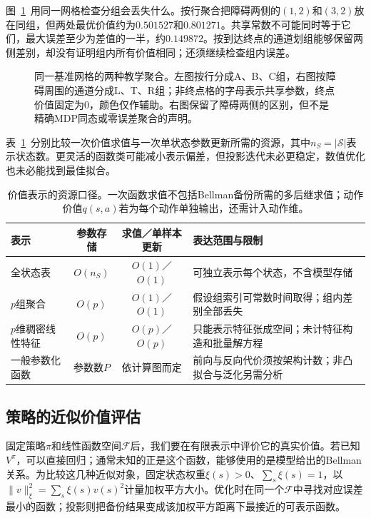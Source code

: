 图~\ref{fig:rl-planning-aggregation}~用同一网格检查分组会丢失什么。按行聚合把障碍两侧的$(1,2)$和$(3,2)$放在同组，但两处最优价值约为$0.501527$和$0.801271$。共享常数不可能同时等于它们，最大误差至少为差值的一半，约$0.149872$。按到达终点的通道划组能够保留两侧差别，却没有证明组内所有价值相同；还须继续检查组内误差。

\begin{figure}[htbp]
 \centering
 
 \caption{同一基准网格的两种教学聚合。左图按行分成A、B、C组，右图按障碍周围的通道分成L、T、R组；非终点格的字母表示共享参数，终点价值固定为0，颜色仅作辅助。右图保留了障碍两侧的区别，但不是精确MDP同态或零误差聚合的声明。}
 \label{fig:rl-planning-aggregation}
\end{figure}

表~\ref{tab:rl-planning-representations}~分别比较一次价值求值与一次单状态参数更新所需的资源，其中$n_S=|\mathcal S|$表示状态数。更灵活的函数类可能减小表示偏差，但投影迭代未必更稳定，数值优化也未必能找到最佳拟合。

\begin{table}[htbp]
 \centering
 \small
 \begin{tabularx}{\linewidth}{@{}lcc>{\raggedright\arraybackslash}X@{}}
  \toprule
  表示 & 参数存储 & 求值／单样本更新 & 表达范围与限制\\
  \midrule
  全状态表 & $O(n_S)$ & $O(1)$／$O(1)$ & 可独立表示每个状态，不含模型存储\\
  $p$组聚合 & $O(p)$ & $O(1)$／$O(1)$ & 假设组索引可常数时间取得；组内差别全部丢失\\
  $p$维稠密线性特征 & $O(p)$ & $O(p)$／$O(p)$ & 只能表示特征张成空间；未计特征构造和批量解方程\\
  一般参数化函数 & 参数数$P$ & 依计算图而定 & 前向与反向代价须按架构计数；非凸拟合与泛化另需分析\\
  \bottomrule
 \end{tabularx}
 \caption{价值表示的资源口径。一次函数求值不包括Bellman备份所需的多后继求值；动作价值$q(s,a)$若为每个动作单独输出，还需计入动作维。}
 \label{tab:rl-planning-representations}
\end{table}

\subsection{策略的近似价值评估}
\label{sec:rl-planning-approximate-evaluation}

固定策略$\pi$和线性函数空间$\mathcal F$后，我们要在有限表示中评价它的真实价值。若已知$V^\pi$，可以直接回归；通常未知的正是这个函数，能够使用的是模型给出的Bellman关系。为比较这几种近似对象，固定状态权重$\xi(s)>0$、$\sum_s\xi(s)=1$，以
$\lVert v\rVert_\xi^2=\sum_s\xi(s)v(s)^2$计量加权平方大小。优化时在同一个$\mathcal F$中寻找对应误差最小的函数；投影则把备份结果变成该加权平方距离下最接近的可表示函数。

